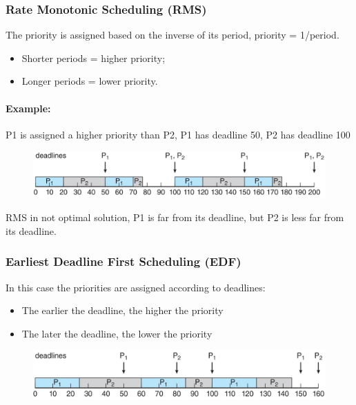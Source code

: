 \subsubsection{Rate Monotonic Scheduling (RMS)}
The priority is assigned based on the inverse of its period, priority = 1/period.

\begin{itemize}
    \item[] Shorter periods = higher priority;
    \item[] Longer periods = lower priority.
\end{itemize}

\paragraph{Example: } P1 is assigned a higher priority than P2, P1 has deadline 50, P2 has deadline 100

\begin{figure}[htbp]
    \centering
    \includegraphics[width=0.7\linewidth]{img/RMP.png}
    
\end{figure}

RMS in not optimal solution, P1 is far from its deadline, but P2 is less far from its deadline. 

\subsubsection{Earliest Deadline First Scheduling (EDF)}

In this case the priorities are assigned according to deadlines:

\begin{itemize}
    \item[] The earlier the deadline, the higher the priority
    \item[] The later the deadline, the lower the priority
\end{itemize}


\begin{figure}[htbp]
    \centering
    \includegraphics[width=0.7\linewidth]{img/EDF.png}
    
    
\end{figure}

